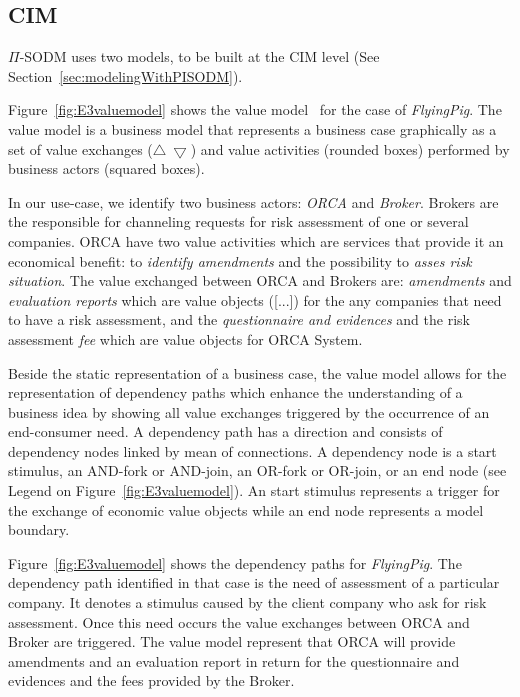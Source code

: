\subsection{CIM}

$\Pi$-SODM uses two models, to be built at the CIM level (See Section~\ref{sec:modelingWithPISODM}).

Figure~\ref{fig:E3valuemodel} shows the value model~\cite{e3value} for the case of \textsl{FlyingPig}.
The value model is a business model that represents a business case graphically as a set of value exchanges ($\bigtriangleup\ \bigtriangledown$) and value activities (rounded boxes) performed by business actors (squared boxes).

In our use-case, we identify two business actors: \textsl{ORCA} and \textsl{Broker}. Brokers are the responsible for channeling requests for risk assessment of one or several companies. ORCA have two value activities which are services that provide it an economical benefit: to \textsl{identify amendments} and the possibility to \textsl{asses risk situation}. The value exchanged between ORCA and Brokers are: \textsl{amendments} and \textsl{evaluation reports} which are value objects ([...]) for the any companies that need to have a risk assessment, and the \textsl{questionnaire and evidences} and the risk assessment \textsl{fee} which are value objects for ORCA System.

Beside the static representation of a business case, the value model allows for the representation of dependency paths which enhance the understanding of a business idea by showing all value exchanges triggered by the occurrence of an end-consumer need. A dependency path has a direction and consists of dependency nodes linked by mean of connections. A dependency node is a start stimulus, an AND-fork or AND-join, an OR-fork or OR-join, or an end node (see Legend on Figure~\ref{fig:E3valuemodel}). An start stimulus represents a trigger for the exchange of economic value objects while an end node represents a model boundary.

Figure~\ref{fig:E3valuemodel} shows the dependency paths for \textsl{FlyingPig}. The dependency path identified in that case is the need of assessment of a particular company. It denotes a stimulus caused by the client company who ask for risk assessment. Once this need occurs the value exchanges between ORCA and Broker are triggered. The value model represent that ORCA will provide amendments and an evaluation report in return for the questionnaire and evidences and the fees provided by the Broker. 

